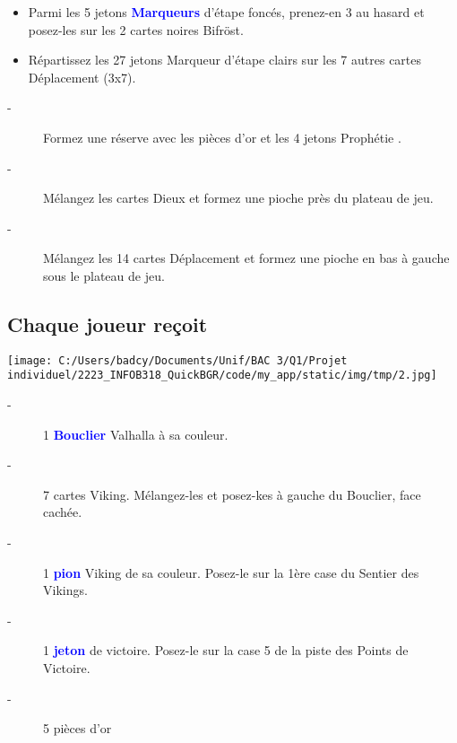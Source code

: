 \documentclass{scrartcl}%
\begin{document}
\begin{itemize}%
\item%
%
 Parmi les 5 jetons %
\textcolor{blue}{%
\textbf{Marqueurs}%
}%
\textit{ }%
 d'étape foncés, prenez{-}en 3 au hasard et posez{-}les sur les 2 cartes noires Bifröst.
%
\item%
%
 Répartissez les 27 jetons Marqueur d'étape clairs sur les 7 autres cartes Déplacement (3x7).
%
\end{itemize}%
\begin{description}%
\item[{-} ]%
%
 Formez une réserve avec les pièces d'or et les 4 jetons Prophétie .
%
\item[{-} ]%
%
 Mélangez les cartes Dieux et formez une pioche près du plateau de jeu.
%
\item[{-} ]%
%
 Mélangez les 14 cartes Déplacement et formez une pioche en bas à gauche sous le plateau de jeu. 
%
\end{description}

%
\subsection{ Chaque joueur reçoit
}%
\label{subsec:Chaquejoueurreoit}%
%
\begin{center}\texttt{[image: C:/Users/badcy/Documents/Unif/BAC 3/Q1/Projet individuel/2223\_INFOB318\_QuickBGR/code/my\_app/static/img/tmp/2.jpg]}\end{center}%

%
\begin{description}%
\item[{-} ]%
%
 1 %
\textcolor{blue}{%
\textbf{Bouclier}%
}%
\textit{ }%
 Valhalla à sa couleur.
%
\item[{-} ]%
%
 7 cartes Viking. Mélangez{-}les et posez{-}kes à gauche du Bouclier, face cachée.
%
\item[{-} ]%
%
 1 %
\textcolor{blue}{%
\textbf{pion}%
}%
\textit{ }%
 Viking de sa couleur. Posez{-}le sur la 1ère case du Sentier des Vikings.
%
\item[{-} ]%
%
 1 %
\textcolor{blue}{%
\textbf{jeton}%
}%
\textit{ }%
 de victoire. Posez{-}le sur la case 5 de la piste des Points de Victoire.
%
\item[{-} ]%
%
 5 pièces d'or
%
\end{description}

%
\end{document}
